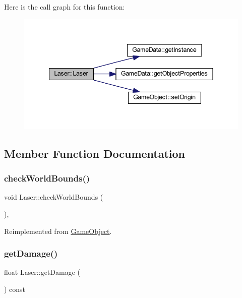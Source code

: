 Here is the call graph for this function\+:
\nopagebreak
\begin{figure}[H]
\begin{center}
\leavevmode
\includegraphics[width=342pt]{class_laser_acae004a0d25fdc1c3926bcfd52678f9c_cgraph}
\end{center}
\end{figure}


\subsection{Member Function Documentation}
\mbox{\label{class_laser_a59c9d2f9bbefdbc978232acf0a1fa978}} 
\subsubsection{\texorpdfstring{check\+World\+Bounds()}{checkWorldBounds()}}
{\footnotesize\ttfamily void Laser\+::check\+World\+Bounds (\begin{DoxyParamCaption}{ }\end{DoxyParamCaption})\hspace{0.3cm}{\ttfamily [override]}, {\ttfamily [virtual]}}



Reimplemented from \hyperlink{class_game_object_a07bcaf0d87bd507f0a6e98abebd70e53}{Game\+Object}.

\mbox{\label{class_laser_a121266b7a10b80a71304e85421eebc3a}} 
\subsubsection{\texorpdfstring{get\+Damage()}{getDamage()}}
{\footnotesize\ttfamily float Laser\+::get\+Damage (\begin{DoxyParamCaption}{ }\end{DoxyParamCaption}) const}

